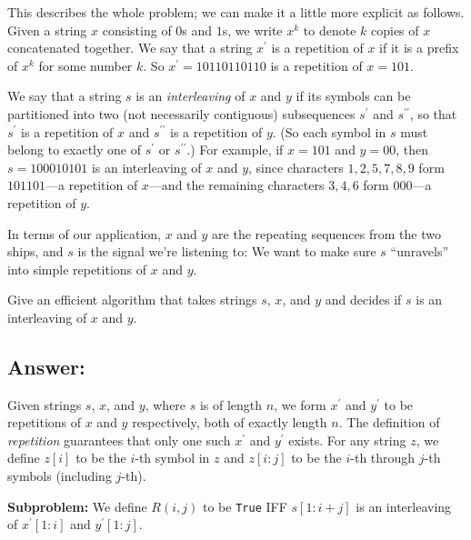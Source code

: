 \documentclass[12pt, letterpaper]{article}
\newcommand{\dprime}{{\prime\prime}}
\begin{document}
This describes the whole problem; we can make it a little more explicit as follows. Given a string $x$ consisting of $0$s and $1$s, we write $x^k$ to denote $k$ copies of $x$ concatenated together. 
We say that a string $x^\prime$ is a repetition of $x$ if it is a prefix of $x^k$ for some number $k$. So $x^\prime = 10110110110$ is a repetition of $x = 101$.

We say that a string $s$ is an \textit{interleaving} of $x$ and $y$ if its symbols can be partitioned into two (not necessarily contiguous) subsequences $s^\prime$ and $s^\dprime$, so that $s^\prime$ is a repetition of $x$ and $s^\dprime$ is a repetition of $y$. (So each symbol in $s$ must belong to exactly one of $s^\prime$ or $s^\dprime$.) For example, if $x = 101$ and $y = 00$, then $s = 100010101$ is an interleaving of $x$ and $y$, since characters $1,2,5,7,8,9$ form $101101$—a repetition of $x$—and the remaining characters $3,4,6$ form $000$—a repetition of $y$.

In terms of our application, $x$ and $y$ are the repeating sequences from the two ships, and $s$ is the signal we're listening to: We want to make sure $s$ ``unravels'' into simple repetitions of $x$ and $y$. 

Give an efficient algorithm that takes strings $s$, $x$, and $y$ and decides if $s$ is an interleaving of $x$ and $y$.

\clearpage
\subsection*{Answer:}
Given strings $s$, $x$, and $y$, where $s$ is of length $n$, we form $x^\prime$ and $y^\prime$ to be repetitions of $x$ and $y$ respectively, both of exactly length $n$.
The definition of \textit{repetition} guarantees that only one such $x^\prime$ and $y^\prime$ exists.
For any string $z$, we define $z[i]$ to be the $i$-th symbol in $z$ and $z[i:j]$ to be the $i$-th through $j$-th symbols (including $j$-th).

\vspace{5mm}
\noindent\textbf{Subproblem:}
We define $R(i, j)$ to be \verb|True| IFF $s[1: i+j]$ is an interleaving of $x^\prime [1:i]$ and $y^\prime [1:j]$.
\end{document}
